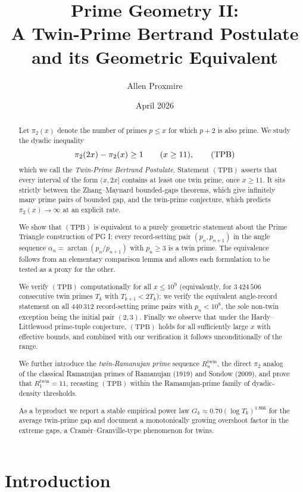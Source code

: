 \documentclass[11pt]{article}
\title{Prime Geometry II:\\
A Twin-Prime Bertrand Postulate and its Geometric Equivalent}
\author{Allen Proxmire}
\date{April 2026}
\begin{document}
\maketitle

\begin{abstract}
Let $\pi_2(x)$ denote the number of primes $p\le x$ for which $p+2$ is
also prime. We study the dyadic inequality
\[
\pi_2(2x)-\pi_2(x)\ge 1\qquad(x\ge 11),\tag{$\mathrm{TPB}$}
\]
which we call the \emph{Twin-Prime Bertrand Postulate}. Statement
$(\mathrm{TPB})$ asserts that every interval of the form $(x,2x]$
contains at least one twin prime, once $x\ge 11$. It sits strictly
between the Zhang--Maynard bounded-gaps theorems, which give infinitely
many prime pairs of bounded gap, and the twin-prime conjecture, which
predicts $\pi_2(x)\to\infty$ at an explicit rate.

We show that $(\mathrm{TPB})$ is equivalent to a purely geometric
statement about the Prime Triangle construction of PG I: every
record-setting pair $(p_n,p_{n+1})$ in the angle sequence
$\alpha_n=\arctan(p_n/p_{n+1})$ with $p_n\ge 3$ is a twin prime. The
equivalence follows from an elementary comparison lemma and allows each
formulation to be tested as a proxy for the other.

We verify $(\mathrm{TPB})$ computationally for all $x\le 10^9$
(equivalently, for $3\,424\,506$ consecutive twin primes $T_k$ with
$T_{k+1}<2T_k$); we verify the equivalent angle-record statement on all
$440\,312$ record-setting prime pairs with $p_n<10^8$, the sole
non-twin exception being the initial pair $(2,3)$. Finally we observe
that under the Hardy--Littlewood prime-tuple conjecture,
$(\mathrm{TPB})$ holds for all sufficiently large $x$ with effective
bounds, and combined with our verification it follows unconditionally
of the range.

We further introduce the \emph{twin-Ramanujan prime} sequence
$R^{\mathrm{twin}}_n$, the direct $\pi_2$ analog of the classical
Ramanujan primes of Ramanujan (1919) and Sondow (2009), and prove
that $R^{\mathrm{twin}}_1=11$, recasting $(\mathrm{TPB})$ within
the Ramanujan-prime family of dyadic-density thresholds.

As a byproduct we report a stable empirical power law
$G_k\approx 0.70(\log T_k)^{1.866}$ for the average twin-prime gap and
document a monotonically growing overshoot factor in the extreme gaps,
a Cram\'er--Granville-type phenomenon for twins.
\end{abstract}

\section{Introduction}
\end{document}
